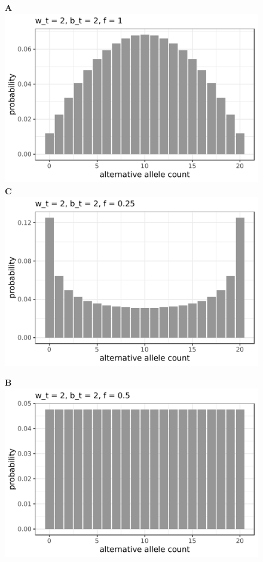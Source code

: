 \documentclass[authoryear,preprint,11pt]{scrartcl}
\begin{document}
\begin{figure}[!tpb]
 \begin{minipage}[t]{.47\linewidth}
  \textbf{A}\\
  \includegraphics[width=.95\linewidth]{figs/Beta_binom_cov-20_w-2_b-2_f-1.pdf} \\
  \textbf{C}\\
  \includegraphics[width=.95\linewidth]{figs/Beta_binom_cov-20_w-2_b-2_f-0-25.pdf} \\
 \end{minipage}
 \begin{minipage}[t]{.47\linewidth}
  \textbf{B}\\
  \includegraphics[width=.95\linewidth]{figs/Beta_binom_cov-20_w-2_b-2_f-0-5.pdf}

\end{minipage}
\end{figure}
\end{document}
